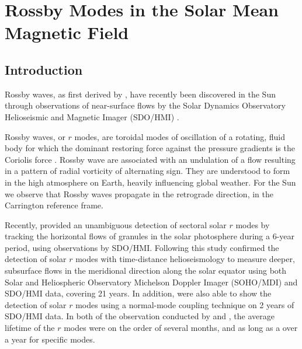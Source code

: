 \chapter{Rossby Modes in the Solar Mean Magnetic Field}\label{chap:rmode}

\section{Introduction}\label{sec:rmode_intro}


Rossby waves, as first derived by \citet{rossby_relation_1939}, have recently been discovered in the Sun through observations of near-surface flows by the Solar Dynamics Observatory Helioseismic and Magnetic Imager (SDO/HMI) \citep{loptien_global-scale_2018, liang_time-distance_2019}.

Rossby waves, or $r$ modes, are toroidal modes of oscillation of a rotating, fluid body for which the dominant restoring force against the pressure gradients is the Coriolis force \citep{lanza_sectoral_2019, hathaway_hydrodynamic_2020}. Rossby wave are associated with an undulation of a flow resulting in a pattern of radial vorticity of alternating sign. They are understood to form in the high atmosphere on Earth, heavily influencing global weather. For the Sun we observe that Rossby waves propagate in the retrograde direction, in the Carrington reference frame.

Recently, \citet{loptien_global-scale_2018} provided an unambiguous detection of sectoral solar $r$ modes by tracking the horizontal flows of granules in the solar photosphere during a 6-year period, using observations by SDO/HMI. Following this study \citet{liang_time-distance_2019} confirmed the detection of solar $r$ modes with time-distance helioseismology to measure deeper, subsurface flows in the meridional direction along the solar equator using both Solar and Heliospheric Observatory Michelson Doppler Imager (SOHO/MDI) and SDO/HMI data, covering 21 years. In addition, \citet{hanasoge_detection_2019} were also able to show the detection of solar $r$ modes using a normal-mode coupling technique on 2 years of SDO/HMI data. In both of the observation conducted by \citet{loptien_global-scale_2018} and \citet{liang_time-distance_2019}, the average lifetime of the $r$ modes were on the order of several months, and as long as a over a year for specific modes.


